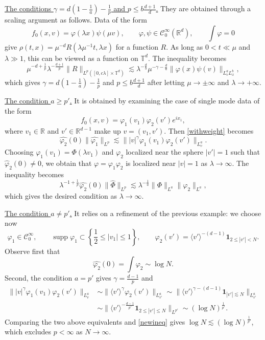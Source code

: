\documentclass[11pt,a4paper,reqno]{amsart}
\theoremstyle{plain}
\theoremstyle{remark}
\begin{document}
\medskip
\noindent\underline{The conditions $\gamma = d(1-\frac{1}{a})-\frac{1}{p}$ and $p\leq b \frac{d+1}{d}$.} They are obtained through a scaling argument as follows. Data of the form 
\[
    f_0(x,v) = \varphi(\lambda x) \psi(\mu v), \qquad \varphi, \psi \in \mathcal{C}_0^\infty(\mathbb{R}^d), \qquad \int \varphi = 0
\]
give $\rho(t,x)=\mu^{-d}R(\lambda\mu^{-1}t,\lambda x)$ for a function $R$. As long as $0<t\ll \mu$ and $\lambda \gg 1$, this can be viewed as a function on $\mathbb{T}^d$. The inequality becomes
\[
    \mu^{-d+\frac{1}{p}}\lambda^{-\frac{d+1}{p}}\|R\|_{L^p([0,c\lambda ] \times \mathbb{T}^d)} \lesssim \lambda^{-\frac{d}{b}}\mu^{-\gamma - \frac{d}{a}} \|\varphi(x)\psi(v)\|_{L^a_vL^b_x},
\]
which gives $\gamma = d(1-\frac{1}{a})-\frac{1}{p}$ and $p\leq b \frac{d+1}{d}$ after letting $\mu \to \pm \infty$ and $\lambda \to + \infty$.

\medskip
\noindent\underline{The condition $a \geq p'$.} It is obtained by examining the case of single mode data of the form
\begin{equation}
    \label{singlemodeansatz}
    f_0(x,v)=\varphi_1(v_1) \varphi_2(v') e^{ix_1},
\end{equation}
where $v_1 \in \mathbb{R}$ and $v' \in \mathbb{R}^{d-1}$ make up $v=(v_1,v')$.
Then \eqref{withweight} becomes
\begin{equation}
    \label{newineq}
    \widehat{\varphi_2}(0) \|\widehat{\varphi_1}\|_{L^p} \lesssim \||v|^{\gamma} \varphi_1(v_1) \varphi_2(v')\|_{L^a_v}.
\end{equation}
Choosing $\varphi_1(v_1) = \Phi(\lambda v_1)$ and $\varphi_2$ localized near the sphere $|v'| = 1$ such that $\widehat{\varphi}_2(0)\neq 0$, we obtain that $\varphi = \varphi_1 \varphi_2$ is localized near $|v|=1$ as $\lambda \to \infty$. The inequality becomes
\[
    \lambda^{-1+\frac 1p} \widehat{\varphi_2}(0) \|\widehat{\Phi}\|_{L^p} \lesssim \lambda^{-\frac 1 a} \| \Phi \|_{L^a} \| \varphi_2 \|_{L^a},
\]
which gives the desired condition as $\lambda \to \infty$.

\medskip
\noindent
\underline{The condition $a\neq p'$.} It relies on a refinement of the previous example: we choose now
\[
    \varphi_1 \in \mathcal{C}^\infty_0, \qquad \operatorname{supp} \varphi_1 \subset \left\{ \frac{1}{2}\leq |v_1| \leq 1\right\},  \qquad \varphi_2(v') = \langle v' \rangle^{-(d-1)} \mathbf{1}_{2 \leq |v'|<N}.
\]
Observe first that
\[
    \widehat{\varphi_2}(0) = \int \varphi_2 \sim \log N.
\]
Second, the condition $a=p'$ gives $\gamma = \frac{d-1}{p}$ and
\begin{align*}
    \||v|^{\gamma} \varphi_1(v_1) \varphi_2(v')\|_{L^a_v} & \sim \| \langle v' \rangle^{\gamma} \varphi_2(v') \|_{L^a_{v'}} \sim \| \langle v' \rangle^{\gamma -(d-1)} \mathbf{1}_{|v'| \lesssim N} \|_{L^{a}_{v'}} \\
    & \sim \| \langle v' \rangle^{-\frac{d-1}{p'}}  \mathbf{1}_{2 \leq |v'| \leq N} \|_{L^{p'}} \sim (\log N)^{\frac{1}{p'}}.
\end{align*}
Comparing the two above equivalents and \eqref{newineq} gives $\log N \lesssim (\log N)^{\frac{1}{p'}}$, which excludes $p < \infty$ as $N \to \infty$.
\end{document}
